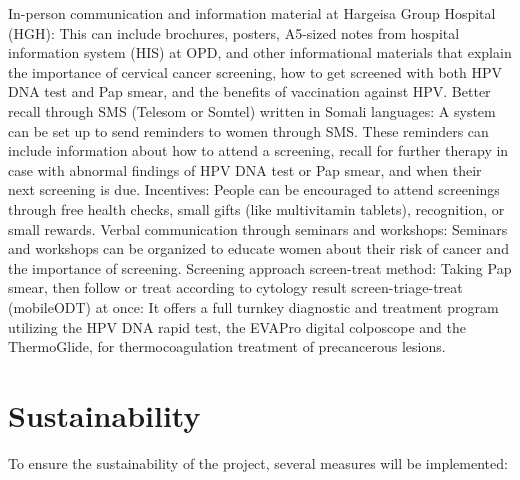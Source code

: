 \documentclass{article}
\begin{document}
\begin{outline} 
\1 In-person communication and information material at Hargeisa Group Hospital (HGH): This can include brochures, posters, A5-sized notes from hospital information system (HIS) at OPD, and other informational materials that explain the importance of cervical cancer screening, how to get screened with both HPV DNA test and Pap smear, and the benefits of vaccination against HPV. 
\1 Better recall through SMS (Telesom or Somtel) written in Somali languages: A system can be set up to send reminders to women through SMS. These reminders can include information about how to attend a screening, recall for further therapy in case with abnormal findings of HPV DNA test or Pap smear, and when their next screening is due.
\1 Incentives: People can be encouraged to attend screenings through free health checks, small gifts (like multivitamin tablets), recognition, or small rewards. 
\1 Verbal communication through seminars and workshops: Seminars and workshops can be organized to educate women about their risk of cancer and the importance of screening. 
\1 Screening approach
    \2 screen-treat method: Taking Pap smear, then follow or treat according to cytology result
    \2 screen-triage-treat (mobileODT)\citep{mobileodt2023} at once: It offers a full turnkey diagnostic and treatment program utilizing the HPV DNA rapid test, the EVAPro digital colposcope and the ThermoGlide, for thermocoagulation treatment of precancerous lesions.

\end{outline}


\section{Sustainability} 
To ensure the sustainability of the project, several measures will be implemented: 
\end{document}
